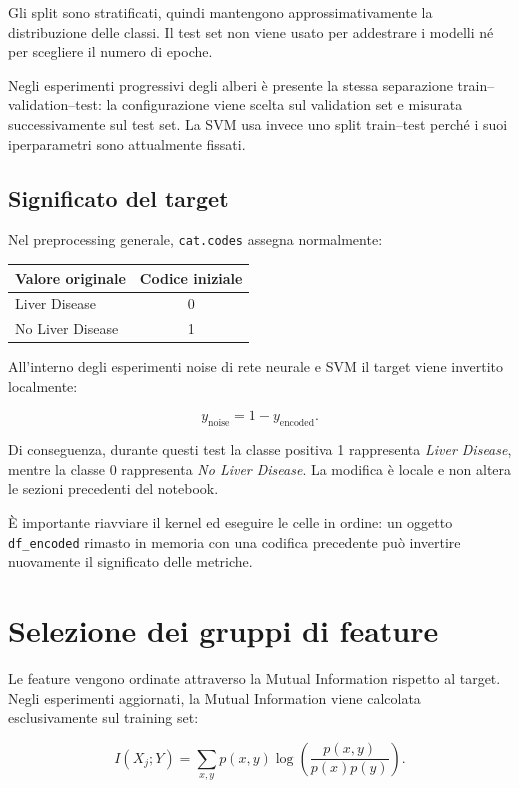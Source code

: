 \documentclass[11pt,a4paper]{article}
\begin{document}
Gli split sono stratificati, quindi mantengono approssimativamente la distribuzione delle classi. Il test set non viene usato per addestrare i modelli né per scegliere il numero di epoche.

Negli esperimenti progressivi degli alberi è presente la stessa separazione train--validation--test: la configurazione viene scelta sul validation set e misurata successivamente sul test set. La SVM usa invece uno split train--test perché i suoi iperparametri sono attualmente fissati.

\subsection{Significato del target}

Nel preprocessing generale, \texttt{cat.codes} assegna normalmente:

\begin{center}
\begin{tabular}{lc}
\toprule
Valore originale & Codice iniziale \\
\midrule
Liver Disease & 0 \\
No Liver Disease & 1 \\
\bottomrule
\end{tabular}
\end{center}

All'interno degli esperimenti noise di rete neurale e SVM il target viene invertito localmente:

\[
y_{\text{noise}} = 1-y_{\text{encoded}}.
\]

Di conseguenza, durante questi test la classe positiva 1 rappresenta \emph{Liver Disease}, mentre la classe 0 rappresenta \emph{No Liver Disease}. La modifica è locale e non altera le sezioni precedenti del notebook.

È importante riavviare il kernel ed eseguire le celle in ordine: un oggetto \texttt{df\_encoded} rimasto in memoria con una codifica precedente può invertire nuovamente il significato delle metriche.

\section{Selezione dei gruppi di feature}

Le feature vengono ordinate attraverso la Mutual Information rispetto al target. Negli esperimenti aggiornati, la Mutual Information viene calcolata esclusivamente sul training set:

\[
I(X_j;Y)=\sum_{x,y}p(x,y)\log\left(\frac{p(x,y)}{p(x)p(y)}\right).
\]
\end{document}

